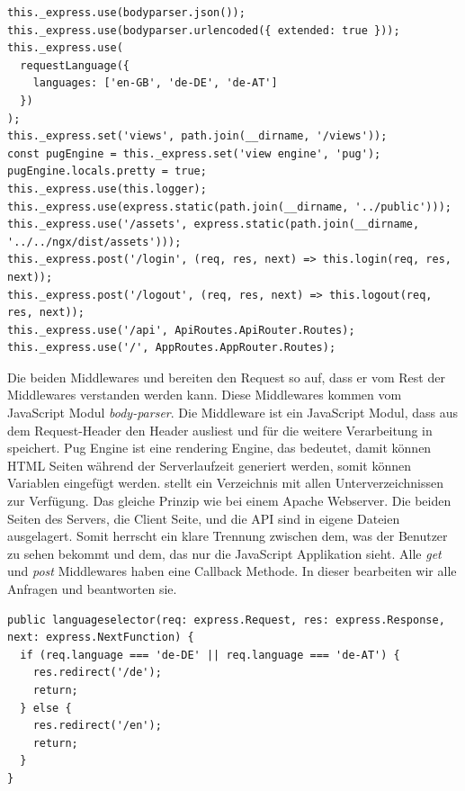 \begin{lstlisting}[style=TS,caption=Middlewares,label=middlewares]
this._express.use(bodyparser.json());
this._express.use(bodyparser.urlencoded({ extended: true }));
this._express.use(
  requestLanguage({
    languages: ['en-GB', 'de-DE', 'de-AT']
  })
);
this._express.set('views', path.join(__dirname, '/views'));
const pugEngine = this._express.set('view engine', 'pug');
pugEngine.locals.pretty = true;
this._express.use(this.logger);
this._express.use(express.static(path.join(__dirname, '../public')));
this._express.use('/assets', express.static(path.join(__dirname, '../../ngx/dist/assets')));
this._express.post('/login', (req, res, next) => this.login(req, res, next));
this._express.post('/logout', (req, res, next) => this.logout(req, res, next));
this._express.use('/api', ApiRoutes.ApiRouter.Routes);
this._express.use('/', AppRoutes.AppRouter.Routes);
\end{lstlisting}

Die beiden Middlewares  und  bereiten den Request so auf, dass er vom Rest der Middlewares verstanden werden kann. Diese Middlewares kommen vom JavaScript Modul \textit{body-parser}. Die Middleware  ist ein JavaScript Modul, dass aus dem Request-Header den Header  ausliest und für die weitere Verarbeitung in  speichert. Pug Engine ist eine rendering Engine, das bedeutet, damit können \ac{HTML} Seiten während der Serverlaufzeit generiert werden, somit können Variablen eingefügt werden.  stellt ein Verzeichnis mit allen Unterverzeichnissen zur Verfügung. Das gleiche Prinzip wie bei einem Apache Webserver. Die beiden Seiten des Servers, die Client Seite, und die \ac{API} sind in eigene Dateien ausgelagert. Somit herrscht ein klare Trennung zwischen dem, was der Benutzer zu sehen bekommt und dem, das nur die JavaScript Applikation sieht. Alle \textit{get} und \textit{post} Middlewares haben eine Callback Methode. In dieser bearbeiten wir alle Anfragen und beantworten sie.

\begin{lstlisting}[caption=Sprachenauswahl,style=TS,label=sprachenauswahl]
public languageselector(req: express.Request, res: express.Response, next: express.NextFunction) {
  if (req.language === 'de-DE' || req.language === 'de-AT') {
    res.redirect('/de');
    return;
  } else {
    res.redirect('/en');
    return;
  }
}
\end{lstlisting}

